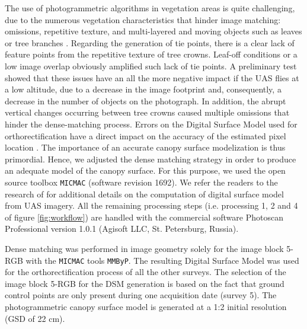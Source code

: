 \documentclass[remotesensing,article,submit,moreauthors,pdftex,12pt,a4paper]{mdpi} %
\begin{document}
The use of photogrammetric algorithms in vegetation areas is quite challenging, due to the numerous vegetation characteristics that hinder image matching: omissions, repetitive texture, and multi-layered and moving objects such as leaves or tree branches \cite{baltsavias_high-quality_2008}. 
Regarding the generation of tie points, there is a clear lack of feature points from the repetitive texture of tree crowns. 
Leaf-off conditions or a low image overlap obviously amplified such lack of tie points. 
A preliminary test showed that these issues have an all the more negative impact if the UAS flies at a low altitude, due to a decrease in the image footprint and, consequently, a decrease in the number of objects on the photograph. 
In addition, the abrupt vertical changes occurring between tree crowns caused multiple omissions that hinder the dense-matching process. 
Errors on the Digital Surface Model used for orthorectification have a direct impact on the accuracy of the estimated pixel location \cite{kempeneers_geometric_2013}. The importance of an accurate canopy surface modelization is thus primordial. 
Hence, we adjusted the dense matching strategy in order to produce an adequate model of the canopy surface. 
For this purpose, we used the open source toolbox {\tt MICMAC} \cite{pierrot-deseilligny_multiresolution_2006} (software revision 1692). 
We refer the readers to the research of \citeauthor{lisein_photogrammetric_2013} \cite{lisein_photogrammetric_2013} for additional details on the computation of digital surface model from UAS imagery. 
All the remaining processing steps (i.e. processing 1, 2 and 4 of figure \ref{fig:workflow}) are handled with the commercial software Photoscan Professional version 1.0.1 (Agisoft LLC, St. Petersburg, Russia). 

Dense matching was performed in image geometry solely for the image block 5-RGB with the {\tt MICMAC} tools {\tt MMByP}. 
The resulting Digital Surface Model was used for the orthorectification process of all the other surveys. 
The selection of the image block 5-RGB for the DSM generation is based on the fact that ground control points are only present during one acquisition date (survey 5). 
The photogrammetric canopy surface model is generated at a 1:2 initial resolution (GSD of 22 cm).
\end{document}
